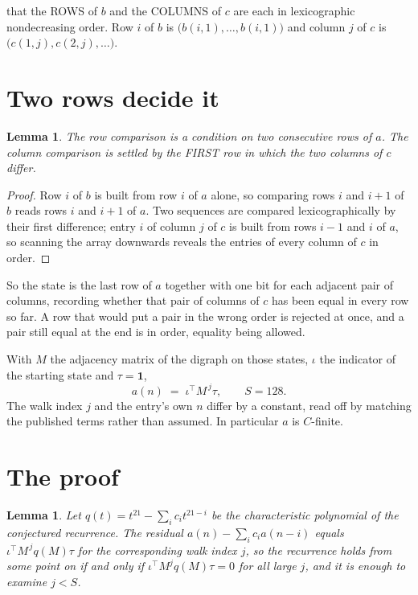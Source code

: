 \documentclass[11pt,a4paper]{article}
\theoremstyle{plain}
\newtheorem{lemma}[theorem]{Lemma}
\theoremstyle{definition}
\begin{document}
that the ROWS of $b$ and the COLUMNS of $c$ are each in lexicographic nondecreasing order. Row $i$ of $b$
is $\bigl(b(i,1),\dots,b(i,1)\bigr)$ and column $j$ of $c$ is
$\bigl(c(1,j),c(2,j),\dots\bigr)$.


\section{Two rows decide it}

\begin{lemma}\label{lem:win}
The row comparison is a condition on two consecutive rows of $a$. The column comparison is
settled by the FIRST row in which the two columns of $c$ differ.
\end{lemma}

\begin{proof}
Row $i$ of $b$ is built from row $i$ of $a$ alone, so comparing rows $i$ and $i+1$ of $b$ reads
rows $i$ and $i+1$ of $a$. Two sequences are compared lexicographically by their first
difference; entry $i$ of column $j$ of $c$ is built from rows $i-1$ and $i$ of $a$, so scanning
the array downwards reveals the entries of every column of $c$ in order.
\end{proof}

So the state is the last row of $a$ together with one bit for each adjacent pair of columns,
recording whether that pair of columns of $c$ has been equal in every row so far. A row that
would put a pair in the wrong order is rejected at once, and a pair still equal at the end is
in order, equality being allowed.

With $M$ the adjacency matrix of the digraph on those states, $\iota$ the indicator of the
starting state and $\tau=\mathbf{1}$,
\[
a(n)\;=\;\iota^{\!\top}M^{\,j}\tau ,\qquad S=128.
\]
The walk index $j$ and the entry's own $n$ differ by a constant, read off by matching the
published terms rather than assumed. In particular $a$ is $C$-finite.

\section{The proof}

\begin{lemma}\label{lem:crit}
Let $q(t)=t^{21}-\sum_i c_it^{21-i}$ be the characteristic polynomial of the
conjectured recurrence. The residual $a(n)-\sum_ic_ia(n-i)$ equals
$\iota^{\!\top}M^{\,j}q(M)\tau$ for the corresponding walk index $j$, so the recurrence
holds from some point on if and only if $\iota^{\!\top}M^{j}q(M)\tau=0$ for all large $j$,
and it is enough to examine $j<S$.
\end{lemma}
\end{document}
